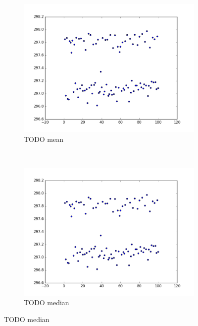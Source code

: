 \documentclass[conference]{IEEEtran}
\begin{document}
\begin{figure}
\centering

\begin{subfigure}{0.22\textwidth}
    \centering
    \includegraphics[width=\textwidth]{experiments/images/mean_repeated_branchsum}
    \caption{TODO mean}
\end{subfigure}%
~
\begin{subfigure}{0.22\textwidth}
    \centering
    \includegraphics[width=\textwidth]{experiments/images/mean_repeated_branchsum}
    \caption{TODO median}
\end{subfigure}


\end{figure}
\end{document}
